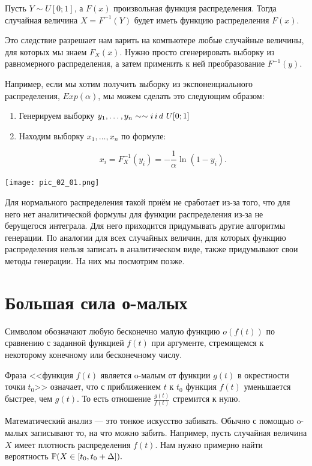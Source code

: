 \documentclass[12pt, a4paper, oneside]{article}
\begin{document}
\begin{result} 
Пусть $Y \sim U[0;1]$, а $F(x)$ произвольная функция распределения. Тогда случайная величина $X = F^{-1}(Y)$ будет иметь функцию распределения $F(x)$.
\end{result} 

Это следствие разрешает нам варить на компьютере любые случайные величины, для которых мы знаем $F_X(x)$. Нужно просто сгенерировать выборку из равномерного распределения, а затем применить к ней преобразование $F^{-1}(y)$. 

Например, если мы хотим получить выборку из экспоненциального распределения, $Exp(\alpha)$,  мы можем сделать это следующим образом: 

\begin{enumerate} 
\item Генерируем выборку $y_1, \ldots, y_n \sim \sim i\,i\,d\,\, U[0;1]$
\item Находим выборку $x_1, \ldots, x_n$ по формуле: 

\[
x_i = F_X^{-1}(y_i) = -\frac{1}{\alpha} \ln(1-y_i).
\]
\end{enumerate} 

\begin{center} 
\texttt{[image: pic\_02\_01.png]}
\end{center} 

Для нормального распределения такой приём не сработает из-за того, что для него нет аналитической формулы для функции распределения из-за не берущегося интеграла. Для него приходится придумывать другие алгоритмы генерации. По аналогии для всех случайных величин, для которых функцию распределения нельзя записать в аналитическом виде, также придумывают свои методы генерации. На них мы посмотрим позже. 

\section{Большая сила о-малых}

Символом  обозначают любую бесконечно малую функцию $o(f(t))$ по сравнению с заданной функцией $f(t)$ при аргументе, стремящемся к некоторому конечному или бесконечному числу. 

Фраза <<функция $f(t)$ является o-малым от функции $g(t)$ в окрестности точки $t_0$>> означает, что с приближением $t$ к $t_0$ функция $f(t)$ уменьшается быстрее, чем $g(t)$. То есть отношение $\frac{g(t)}{f(t)}$ стремится к нулю. 

Математический анализ --- это тонкое искусство забивать. Обычно с помощью o-малых записывают то, на что можно забить. Например, пусть случайная величина $X$ имеет плотность распределения $f(t)$. Нам нужно примерно найти вероятность $\mathbb{P}(X \in [t_0, t_0 + \Delta]).$
\end{document}
